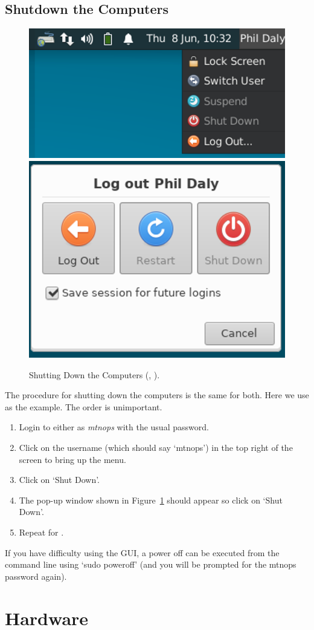 \documentclass[12pt,twoside]{article}
\begin{document}
\subsection{Shutdown the Computers}
\begin{figure}[!h]
 \centering
 \includegraphics[width=0.45\linewidth]{bonsai1.png}
 \includegraphics[width=0.45\linewidth]{bonsai2.png}
 \caption{Shutting Down the Computers (, ).}
 \label{computershutdown}
\end{figure}

The procedure for shutting down the computers is the same for both. Here we use  as the example.
The order is unimportant.

\begin{enumerate}
\item Login to either  as \emph{mtnops} with the usual password.
\item Click on the username (which should say `mtnops') in the top right of the screen to bring up the menu.
\item Click on `Shut Down'.
\item The pop-up window shown in Figure~\ref{computershutdown} should appear so click on `Shut Down'.
\item Repeat for .
\end{enumerate}

If you have difficulty using the GUI, a power off can be executed from the command line using `sudo poweroff'
(and you will be prompted for the mtnops password again).

\section{Hardware}
\label{Hardware}
\end{document}
